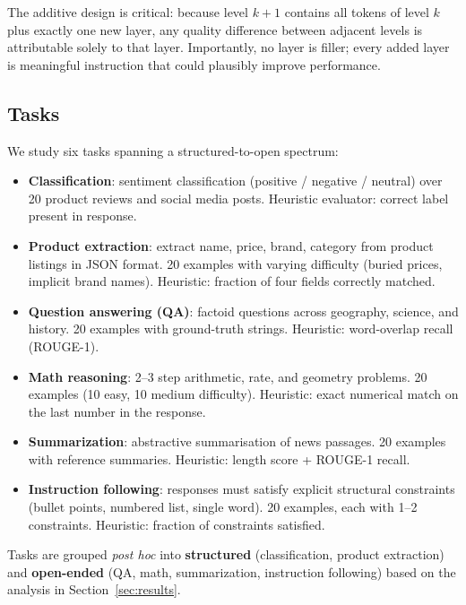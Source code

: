 The additive design is critical: because level $k+1$ contains all tokens of
level $k$ plus exactly one new layer, any quality difference between adjacent
levels is attributable solely to that layer.
Importantly, no layer is filler; every added layer is meaningful instruction
that could plausibly improve performance.

\subsection{Tasks}
\label{sec:tasks}

We study six tasks spanning a structured-to-open spectrum:

\begin{itemize}
  \item \textbf{Classification}: sentiment classification (positive / negative / neutral)
    over 20 product reviews and social media posts.
    Heuristic evaluator: correct label present in response.
  \item \textbf{Product extraction}: extract name, price, brand, category from
    product listings in JSON format.
    20 examples with varying difficulty (buried prices, implicit brand names).
    Heuristic: fraction of four fields correctly matched.
  \item \textbf{Question answering (QA)}: factoid questions across geography,
    science, and history. 20 examples with ground-truth strings.
    Heuristic: word-overlap recall (ROUGE-1).
  \item \textbf{Math reasoning}: 2--3 step arithmetic, rate, and geometry
    problems. 20 examples (10 easy, 10 medium difficulty).
    Heuristic: exact numerical match on the last number in the response.
  \item \textbf{Summarization}: abstractive summarisation of news passages.
    20 examples with reference summaries.
    Heuristic: length score + ROUGE-1 recall.
  \item \textbf{Instruction following}: responses must satisfy explicit
    structural constraints (bullet points, numbered list, single word).
    20 examples, each with 1--2 constraints.
    Heuristic: fraction of constraints satisfied.
\end{itemize}

Tasks are grouped \textit{post hoc} into \textbf{structured} (classification,
product extraction) and \textbf{open-ended} (QA, math, summarization,
instruction following) based on the analysis in Section~\ref{sec:results}.


